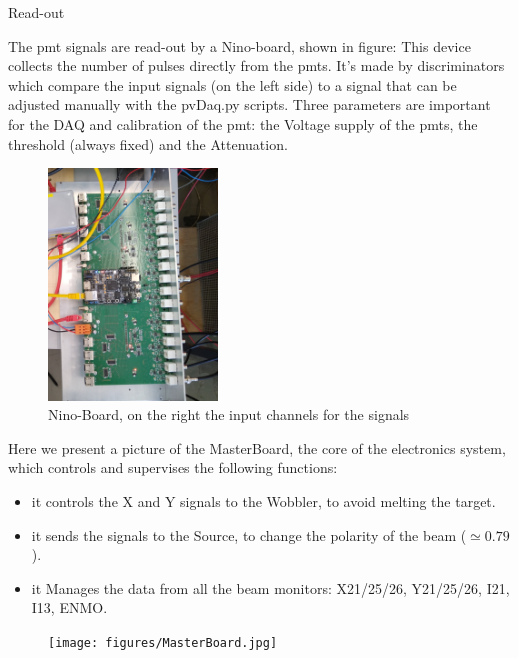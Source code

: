 \documentclass[8pt,a4paper]{beamer}
\begin{document}
\begin{frame}{Read-out}

The pmt signals are read-out by a Nino-board, shown in figure: This device collects the number of pulses directly from the pmts. It’s made by discriminators which compare the input signals (on the left side) to a signal that can be adjusted manually with the pvDaq.py scripts. Three parameters are important for the DAQ and calibration of the pmt: the Voltage supply of the pmts, the threshold (always fixed) and the Attenuation.

\begin{figure}[hbtp]
 
 \centering
 \includegraphics[width = 0.4\textwidth]{figures/NinoBoard.jpg}
 \caption{Nino-Board, on the right the input channels for the signals}
 \end{figure}
  
\end{frame}

\begin{frame}

Here we present a picture of the MasterBoard, the core of the electronics system, which controls and supervises the following functions:

\begin{itemize}
\item it controls the X and Y signals to the Wobbler, to avoid melting the target.
\item it sends the signals to the Source, to change the polarity of the beam ($\simeq 0.79$).
\item it Manages the data from all the beam monitors: X21/25/26, Y21/25/26, I21, I13, ENMO.

\end{itemize}


\begin{figure}
\centering
\texttt{[image: figures/MasterBoard.jpg]}
\end{figure}
 
\end{frame}
\end{document}
